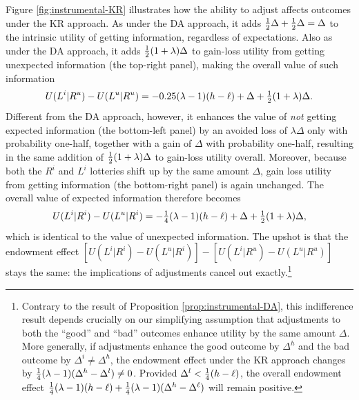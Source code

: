 Figure \ref{fig:instrumental-KR} illustrates how the ability to adjust affects outcomes under the KR approach. As under the DA approach, it adds $\tfrac{1}{2} \Delta + \tfrac{1}{2} \Delta = \Delta$ to the intrinsic utility of getting information, regardless of expectations. Also as under the DA approach, it adds $\tfrac{1}{2} (1+\lambda) \Delta$ to gain-loss utility from getting unexpected information (the top-right panel), making the overall value of such information
\begin{equation*}
  U(L^i|R^u)-U(L^u|R^u)=-0.25(\lambda-1)(h-\ell)+\Delta+\tfrac{1}{2} (1+\lambda)\Delta.
\end{equation*}
Different from the DA approach, however, it enhances the value of \emph{not} getting expected information (the bottom-left panel) by an avoided loss of $\lambda \Delta$ only with probability one-half, together with a gain of $\Delta$ with probability one-half, resulting in the same addition of $\tfrac{1}{2}(1+\lambda)\Delta$ to gain-loss utility overall. Moreover, because both the $R^i$ and $L^i$ lotteries shift up by the same amount $\Delta$, gain loss utility from getting information (the bottom-right panel) is again unchanged. The overall value of expected information therefore becomes
\begin{equation*}
  U(L^i|R^i)-U(L^u|R^i)=-\tfrac{1}{4}(\lambda-1)(h-\ell)+\Delta+\tfrac{1}{2} (1+\lambda)\Delta,
\end{equation*}
which is identical to the value of unexpected information. The upshot is that the endowment effect $[U(L^i|R^i)-U(L^u|R^i)]-[U(L^i|R^u)-U(L^u|R^u)]$ stays the same: the implications of adjustments cancel out exactly.\footnote{Contrary to the result of Proposition \ref{prop:instrumental-DA}, this indifference result depends crucially on our simplifying assumption that adjustments to both the \enquote{good} and \enquote{bad} outcomes enhance utility by the same amount $\Delta$. More generally, if adjustments enhance the good outcome by $\Delta^h$ and the bad outcome by $\Delta^i \neq \Delta^h$, the endowment effect under the KR approach changes by $\tfrac{1}{4}(\lambda-1)(\Delta^h-\Delta^l) \neq 0$. Provided $\Delta^l<\tfrac{1}{4}(h-\ell)$, the overall endowment effect $\tfrac{1}{4}(\lambda-1)(h-\ell)+\tfrac{1}{4}(\lambda-1)(\Delta^h-\Delta^\ell)$ will remain positive.}

\FloatBarrier
